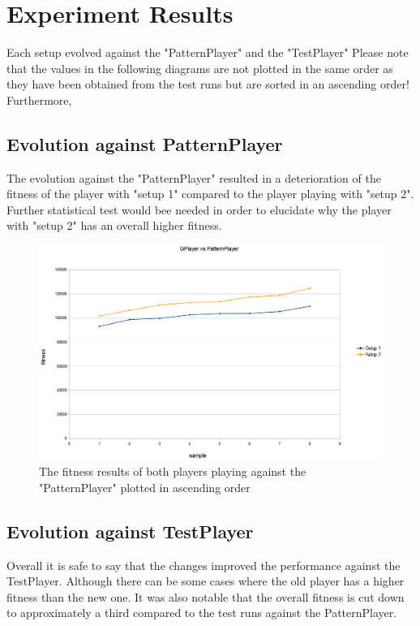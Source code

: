 \documentclass[12pt,fleqn,a4paper]{article}
\begin{document}
\section{Experiment Results}
\label{sec:expres}
Each setup evolved against the "PatternPlayer" and the "TestPlayer"  
Please note that the values in the following diagrams are not plotted in the same order as they have been obtained from the test runs but are sorted in an ascending order!\\
Furthermore, 

\subsection{Evolution against PatternPlayer}
The evolution against the "PatternPlayer" resulted in a deterioration of the fitness of the player with "setup 1" compared to the player playing with "setup 2".\\
Further statistical test would bee needed in order to elucidate why the player with "setup 2" has an overall higher fitness.

\begin{figure}[!h]
	\begin{center}
	\includegraphics[width=.7\textwidth]{gp_vs_pp_new.png}
	\caption{The fitness results of both players playing against the "PatternPlayer" plotted in ascending order}
	\end{center}
\end{figure}

\newpage
\subsection{Evolution against TestPlayer}
Overall it is safe to say that the changes improved the performance against the TestPlayer. Although there can be some cases where the old player has a higher fitness than the new one. It was also notable that the overall fitness is cut down to approximately a third compared to the test runs against the PatternPlayer.
\end{document}
